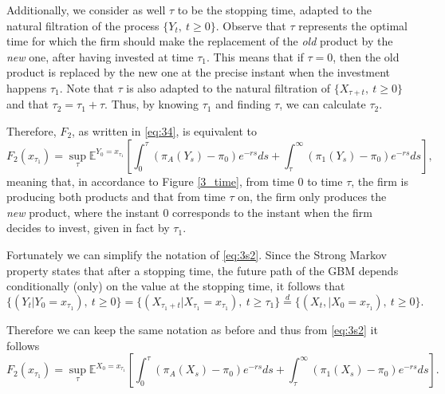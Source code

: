 Additionally, we consider as well $\tau$ to be the stopping time, adapted to the natural filtration of the process $\{Y_t, \ t\geq0\}$. Observe that $\tau$ represents the optimal time for which the firm should make the replacement of the \textit{old} product by the \textit{new} one, after having invested at time $\tau_1$. This means that  if $\tau=0$, then the old product is replaced by the new one at the precise instant when the investment happens $\tau_1$. Note that $\tau$ is also adapted to the natural filtration of $\{ X_{\tau+t},\ t\geq0 \}$ and that $\tau_2=\tau_1+\tau$. Thus, by knowing $\tau_1$ and finding $\tau$, we can calculate $\tau_2$.

Therefore, $F_2$, as written in \eqref{eq:34}, is equivalent to
\begin{equation}
F_2(x_{\tau_1})=\sup_{\tau} \mathds{E}^{Y_0=x_{\tau_1}} \left[ \int_0^{\tau} \left( \pi_A(Y_s)-\pi_0 \right) e^{-rs}ds + \int_{\tau}^\infty \left( \pi_1(Y_s)-\pi_0 \right) e^{-rs}ds  \right],
\label{eq:3s2}
\end{equation}
meaning that, in accordance to Figure \ref{3_time}, from time 0 to time $\tau$, the firm is producing both products and that from time $\tau$ on, the firm only produces the \textit{new} product, where the instant 0 corresponds to the instant when the firm decides to invest, given in fact by $\tau_1$.

Fortunately we can simplify the notation of \eqref{eq:3s2}. Since the Strong Markov property states that after a stopping time, the future path of the GBM depends conditionally (only) on the value at the stopping time, it follows that 
$$\{(Y_t | Y_0=x_{\tau_1}), \ t\geq0 \} = \{(X_{\tau_1+t} | X_{\tau_1}=x_{\tau_1}),\ t\geq \tau_1 \} \overset{d}{=}  \{(X_{t}, | X_0=x_{\tau_1}), \ t\geq0 \}. $$

Therefore we can keep the same notation as before and thus from \eqref{eq:3s2} it follows
\begin{equation}
F_2(x_{\tau_1})=\sup_{\tau} \mathds{E}^{X_0=x_{\tau_1}} \left[ \int_0^{\tau} \left( \pi_A(X_s)-\pi_0 \right) e^{-rs}ds + \int_{\tau}^\infty \left( \pi_1(X_s)-\pi_0 \right) e^{-rs}ds  \right].
\label{eq:3s3}
\end{equation}


